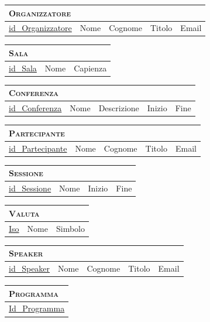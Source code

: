 	\begin{tabular}{|l|l|l|l|l|}
		\multicolumn{5}{l}{\textsc{Organizzatore}} \\ \hline
		\underline{id\_Organizzatore} & Nome & Cognome & Titolo & Email \\ \hline
	\end{tabular}


	\begin{tabular}{|l|l|l|}
		\multicolumn{3}{l}{\textsc{Sala}} \\ \hline
		\underline{id\_Sala} & Nome & Capienza \\ \hline
	\end{tabular}


	\begin{tabular}{|l|l|l|l|l|}
		\multicolumn{5}{l}{\textsc{Conferenza}} \\ \hline
		\underline{id\_Conferenza} & Nome & Descrizione & Inizio & Fine \\ \hline
	\end{tabular}


	\begin{tabular}{|l|l|l|l|l|}
		\multicolumn{5}{l}{\textsc{Partecipante}} \\ \hline
		\underline{id\_Partecipante} & Nome & Cognome & Titolo & Email \\ \hline
	\end{tabular}


	\begin{tabular}{|l|l|l|l|}
		\multicolumn{4}{l}{\textsc{Sessione}} \\ \hline
		\underline{id\_Sessione} & Nome & Inizio & Fine \\ \hline
	\end{tabular}


	\begin{tabular}{|l|l|l|}
		\multicolumn{3}{l}{\textsc{Valuta}} \\ \hline
		\underline{Iso} & Nome & Simbolo \\ \hline
	\end{tabular}


	\begin{tabular}{|l|l|l|l|l|}
		\multicolumn{5}{l}{\textsc{Speaker}} \\ \hline
		\underline{id\_Speaker} & Nome & Cognome & Titolo & Email \\ \hline
	\end{tabular}


	\begin{tabular}{|l|}
		\multicolumn{1}{l}{\textsc{Programma}} \\ \hline
		\underline{Id\_Programma} \\ \hline
	\end{tabular}


